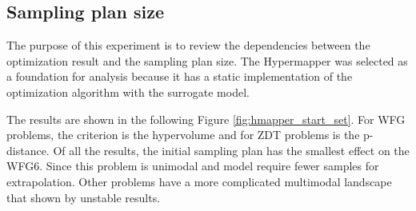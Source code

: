     \subsection{Sampling plan size}
    The purpose of this experiment is to review the dependencies between the optimization result and the sampling plan size. The Hypermapper was selected as a foundation for analysis because it has a static implementation of the optimization algorithm with the surrogate model.

    The results are shown in the following Figure \ref{fig:hmapper_start_set}. For WFG problems, the criterion is the hypervolume and for ZDT problems is the p-distance. Of all the results, the initial sampling plan has the smallest effect on the WFG6. Since this problem is unimodal and model require fewer samples for extrapolation. Other problems have a more complicated multimodal landscape that shown by unstable results. 

